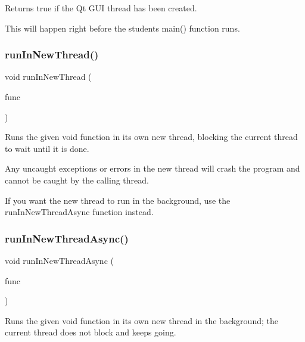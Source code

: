 Returns true if the Qt G\+UI thread has been created. 

This will happen right before the student\textquotesingle{}s main() function runs. \mbox{\label{classGThread_ac9475674a195d39d457307b3e7365ddd}} 
\subsubsection{\texorpdfstring{run\+In\+New\+Thread()}{runInNewThread()}}
{\footnotesize\ttfamily void run\+In\+New\+Thread (\begin{DoxyParamCaption}\item[{G\+Thunk}]{func }\end{DoxyParamCaption})\hspace{0.3cm}{\ttfamily [static]}}



Runs the given void function in its own new thread, blocking the current thread to wait until it is done. 

Any uncaught exceptions or errors in the new thread will crash the program and cannot be caught by the calling thread.

If you want the new thread to run in the background, use the {\ttfamily run\+In\+New\+Thread\+Async} function instead. \mbox{\label{classGThread_ad40c76521d01473a3eea90c01000d9e2}} 
\subsubsection{\texorpdfstring{run\+In\+New\+Thread\+Async()}{runInNewThreadAsync()}}
{\footnotesize\ttfamily void run\+In\+New\+Thread\+Async (\begin{DoxyParamCaption}\item[{G\+Thunk}]{func }\end{DoxyParamCaption})\hspace{0.3cm}{\ttfamily [static]}}



Runs the given void function in its own new thread in the background; the current thread does not block and keeps going. 

